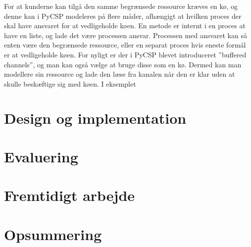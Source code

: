 For at kunderne kan tilgå den samme begrænsede ressource kræves en kø, og denne kan i PyCSP modeleres på flere måder, afhængigt at hvilken proces der skal have ansvaret for at vedligeholde køen. En metode er internt i en proces at have en liste, og lade det være processen ansvar. Processen med ansvaret kan så enten være den begrænsede ressource, eller en separat proces hvis eneste formål er at vedligeholde køen. For nyligt er der i PyCSP blevet introduceret ''buffered channels'', og man kan også vælge at bruge disse som en kø. Dermed kan man modellere sin ressource og lade den læse fra kanalen når den er klar uden at skulle beskæftige sig med køen. I eksemplet 
  \section{Design og implementation}
    
  \section{Evaluering}
  \section{Fremtidigt arbejde}
  \section{Opsummering}
